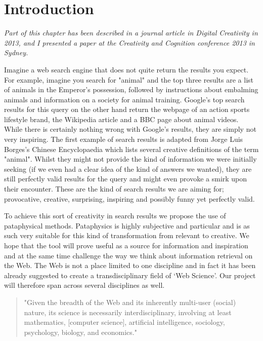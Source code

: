 
\chapter{Introduction}
\label{ch:intro}

\emph{Part of this chapter has been described in a journal article in Digital Creativity in 2013, and I presented a paper at the Creativity and Cognition conference 2013 in Sydney.}

\grule

Imagine a web search engine that does not quite return the results you expect. For example, imagine you search for "animal" and the top three results are a list of animals in the Emperor's possession, followed by instructions about embalming animals and information on a society for animal training. Google's top search results for this query on the other hand return the webpage of an action sports lifestyle brand, the Wikipedia article and a BBC page about animal videos. While there is certainly nothing wrong with Google's results, they are simply not very inspiring. The first example of search results is adapted from Jorge Luis Borges's Chinese Encyclopaedia \citep{Borges2000}  which lists several creative definitions of the term "animal". Whilst they might not provide the kind of information we were initially seeking (if we even had a clear idea of the kind of answers we wanted), they are still perfectly valid results for the query and might even provoke a smirk upon their encounter. These are the kind of search results we are aiming for; provocative, creative, surprising, inspiring and possibly funny yet perfectly valid.

To achieve this sort of creativity in search results we propose the use of pataphysical methods. Pataphysics is highly subjective and particular and is as such very suitable for this kind of transformation from relevant to creative. We hope that the tool will prove useful as a source for information and inspiration and at the same time challenge the way we think about information retrieval on the Web. The Web is not a place limited to one discipline and in fact it has been already suggested to create a transdisciplinary field of ‘Web Science'. Our project will therefore span across several disciplines as well.

\begin{quote}
  "Given the breadth of the Web and its inherently multi-user (social) nature, its science is necessarily interdisciplinary, involving at least mathematics, [computer science], artificial intelligence, sociology, psychology, biology, and economics." \citep{Hendler2008}
\end{quote}

